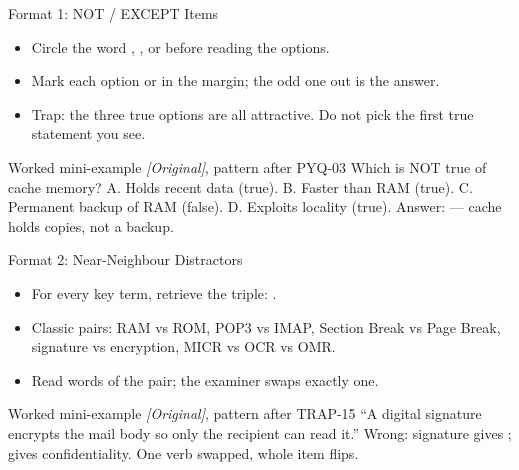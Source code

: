 \documentclass[aspectratio=169]{beamer}
\begin{document}
\begin{frame}{Format 1: NOT / EXCEPT Items}
  \begin{itemize}
    \item Circle the word , , or  before
      reading the options.
    \item Mark each option  or  in the margin; the odd
      one out is the answer.
    \item Trap: the three true options are all attractive. Do not pick the
      first true statement you see.
  \end{itemize}
  \begin{exampleblock}{Worked mini-example \textit{[Original]}, pattern after PYQ-03}
    Which is NOT true of cache memory? A. Holds recent data (true).
    B. Faster than RAM (true). C. Permanent backup of RAM (false).
    D. Exploits locality (true). Answer:  --- cache holds copies,
    not a backup.
  \end{exampleblock}
\end{frame}

\begin{frame}{Format 2: Near-Neighbour Distractors}
  \begin{itemize}
    \item For every key term, retrieve the triple: .
    \item Classic pairs: RAM vs ROM, POP3 vs IMAP, Section Break vs Page
      Break, signature vs encryption, MICR vs OCR vs OMR.
    \item Read  words of the pair; the examiner swaps exactly one.
  \end{itemize}
  \begin{exampleblock}{Worked mini-example \textit{[Original]}, pattern after TRAP-15}
    ``A digital signature encrypts the mail body so only the recipient can
    read it.'' Wrong: signature gives ;
     gives confidentiality. One verb swapped, whole item flips.
  \end{exampleblock}
\end{frame}
\end{document}
